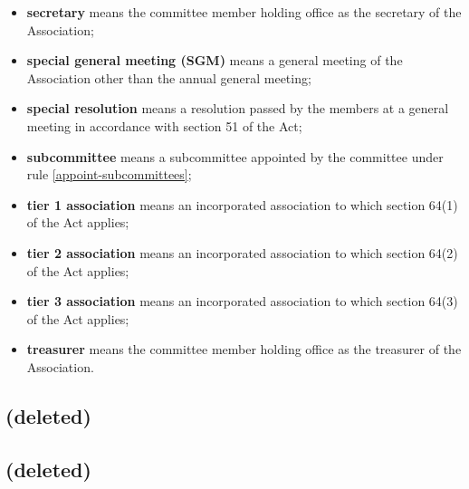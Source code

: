 \documentclass[../constitution.tex]{subfiles}
\begin{document}
\begin{itemize}[label={-}]
  \item \textbf{secretary} means the committee member holding office as the secretary of the Association;
  \item \textbf{special general meeting (SGM)} means a general meeting of the Association other than the annual general meeting;
  \item \textbf{special resolution} means a resolution passed by the members at a general meeting in accordance with section 51 of the Act;
  \item \textbf{subcommittee} means a subcommittee appointed by the committee under rule \ref{appoint-subcommittees};
  \item \textbf{tier 1 association} means an incorporated association to which section 64(1) of the Act applies;
  \item \textbf{tier 2 association} means an incorporated association to which section 64(2) of the Act applies;
  \item \textbf{tier 3 association} means an incorporated association to which section 64(3) of the Act applies;
  \item \textbf{treasurer} means the committee member holding office as the treasurer of the Association.
\end{itemize}


\subsection{(deleted)}


\subsection{(deleted)}
\end{document}
